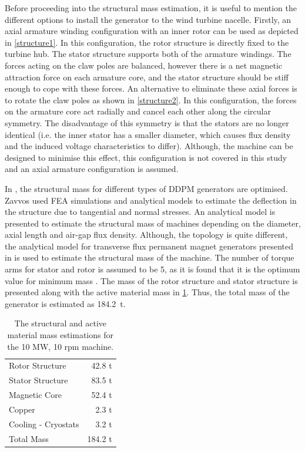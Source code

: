 \documentclass[12pt]{iopart}
\begin{document}
Before proceeding into the structural mass estimation, it is useful to mention the different options to install the generator to the wind turbine nacelle. Firstly, an axial armature winding configuration with an inner rotor can be used as depicted in \ref{structure1}. In this configuration, the rotor structure is directly fixed to the turbine hub.  The stator structure supports both of the armature windings. The forces acting on the claw poles are balanced, however there is a net magnetic attraction force on each armature core, and the stator structure should be stiff enough to cope with these forces. An alternative to eliminate these axial forces is to rotate the claw poles as shown in \ref{structure2}. In this configuration, the forces on the armature core act radially and cancel each other along the circular symmetry. The disadvantage of this symmetry is that the stators are no longer identical (i.e. the inner stator has a smaller diameter, which causes flux density and the induced voltage characteristics to differ). Although, the machine can be designed to minimise this effect, this configuration is not covered in this study and an axial armature configuration is assumed.


In \cite{Zavvos2013}, the structural mass for different types of DDPM generators are optimised. Zavvos used FEA simulations and analytical models to estimate the deflection in the structure due to tangential and normal stresses. An analytical model is presented to estimate the structural mass of machines depending on the diameter, axial length and air-gap flux density. Although, the topology is quite different, the analytical model for transverse flux permanent magnet generators presented in \cite{Zavvos2013} is used to estimate the structural mass of the machine. The number of torque arms for stator and rotor is assumed to be 5, as it is found that it is the optimum value for minimum mass \cite{Zavvos2013}. The mass of the rotor structure and stator structure is presented along with the active material mass in \ref{10MW_total_mass}. Thus, the total mass of the generator is estimated as 184.2~t.


\begin{table}
  \centering
  \begin{tabular}{lr}
\hline
Rotor Structure & 42.8 t \\
Stator Structure & 83.5 t \\
\hline
Magnetic Core & 52.4 t\\
Copper & 2.3 t\\
Cooling - Cryostats & 3.2 t \\
\hline
Total Mass & 184.2 t \\
\hline
 \end{tabular}
  \caption{The structural and active material mass estimations for the 10 MW, 10 rpm machine.}
  \label{10MW_total_mass}
\end{table}
\end{document}
